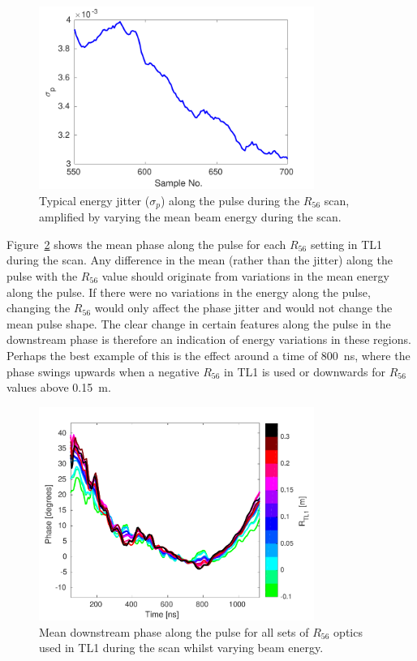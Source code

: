 \begin{figure}
  \centering
  \includegraphics[width=0.8\textwidth]{Figures/propagation/R56ScanGunWiggle_EnergyJitterAlong}
  \caption{Typical energy jitter (\(\sigma_p\)) along the pulse during the \(R_{56}\) scan, amplified by varying the mean beam energy during the scan.}
  \label{f:R56ScanGunWiggle_EnergyJitterAlong}
\end{figure}

Figure~\ref{f:r56Scan_meanPhaseAlong} shows the mean phase along the pulse for each \(R_{56}\) setting in TL1 during the scan. Any difference in the mean (rather than the jitter) along the pulse with the \(R_{56}\) value should originate from variations in the mean energy along the pulse. If there were no variations in the energy along the pulse, changing the \(R_{56}\) would only affect the phase jitter and would not change the mean pulse shape. The clear change in certain features along the pulse in the downstream phase is therefore an indication of energy variations in these regions. Perhaps the best example of this is the effect around a time of 800~ns, where the phase swings upwards when a negative \(R_{56}\) in TL1 is used or downwards for \(R_{56}\) values above 0.15~m.

\begin{figure}
  \centering
  \includegraphics[width=0.8\textwidth]{Figures/propagation/r56Scan_meanPhaseAlong}
  \caption{Mean downstream phase along the pulse for all sets of \(R_{56}\) optics used in TL1 during the scan whilst varying beam energy.}
  \label{f:r56Scan_meanPhaseAlong}
\end{figure}

